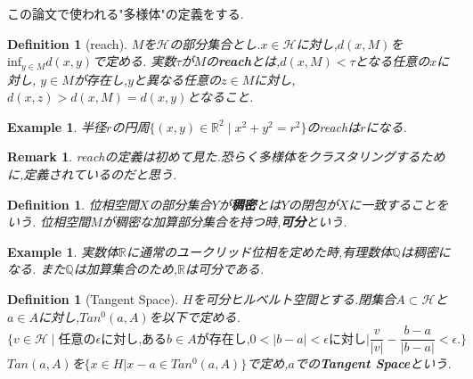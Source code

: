 \documentclass{ujarticle}
\newtheorem{dfn}[thm]{Definition}
\newtheorem{epl}[thm]{Example}
\newtheorem*{rem}{Remark}
\begin{document}
この論文で使われる"多様体"の定義をする.
\begin{dfn}[reach]
  $M$を$\mathcal{H}$の部分集合とし.$x\in \mathcal{H}$に対し,$d(x,M)$を$\mathrm{inf}_{y \in M}d(x,y)$で定める.
  実数$\tau$が$M$の\textbf{reach}とは,$d(x,M)< \tau$となる任意の$x$に対し,
  $y\in M$が存在し,$y$と異なる任意の$z\in M$に対し,$d(x,z) > d(x,M)=d(x,y)$となること.
\end{dfn}
\begin{epl}
 半径$r$の円周$\{(x,y) \in \mathbb{R}^2 \mid x^2+y^2=r^2 \}$のreachは$r$になる.
\end{epl}
\begin{rem}
 reachの定義は初めて見た.恐らく多様体をクラスタリングするために,定義されているのだと思う.
\end{rem}
\begin{dfn}
 位相空間$X$の部分集合$Y$が\textbf{稠密}とは$Y$の閉包が$X$に一致することをいう.
 位相空間$M$が稠密な加算部分集合を持つ時,\textbf{可分}という.
\end{dfn}
\begin{epl}
 実数体$\mathbb{R}$に通常のユークリッド位相を定めた時,有理数体$\mathbb{Q}$は稠密になる.
 また$\mathbb{Q}$は加算集合のため,$\mathbb{R}$は可分である.
\end{epl}

\begin{dfn}[Tangent Space]
$H$を可分ヒルベルト空間とする.閉集合$A \subset \mathcal{H}$と$a \in A$に対し,$Tan^0(a,A)$を以下で定める.
\begin{equation*}
  \{ v \in \mathcal{H} \mid \mbox{任意の} \epsilon \mbox{に対し,ある} b \in A \mbox{が存在し,}
  0 <| b- a| < \epsilon \mbox{に対し} |\frac{v}{|v|} - \frac{b-a}{|b-a|} < \epsilon.\}
\end{equation*}
$Tan(a,A)$を$\{x \in H| x -a \in Tan^0(a,A)\}$で定め,$a$での\textbf{Tangent Space}という.
\end{dfn}
\end{document}
